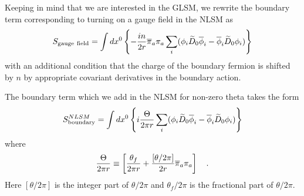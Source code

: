 \documentclass[a4paper,12pt]{article}
\begin{document}
Keeping in mind that we are interested in the GLSM, we rewrite
the boundary term corresponding to turning on a gauge field
in the NLSM as
\begin{equation}
S_{\rm gauge~field}= \int dx^0\left\{ 
-{{in}\over{2 r}} \overline{\pi}_a \pi_a
\sum_i (\phi_i \widetilde{D}_0\overline{\phi}_i - \overline{\phi}_i
\widetilde{D}_0 \phi_i)
\right\}
\end{equation}
with an additional condition that the charge of the boundary fermion
is shifted by $n$ by appropriate covariant derivatives in the boundary
action.

The boundary term which we add in the NLSM for non-zero theta takes the
form
\begin{equation}
S^{NLSM}_{\rm boundary}= \int dx^0\left\{  i{\Theta\over{2\pi r}}
\sum_i (\phi_i \widetilde{D}_0\overline{\phi}_i - \overline{\phi}_i
\widetilde{D}_0 \phi_i)
\right\}
\end{equation}
where 
$$
{\Theta\over{2\pi r}}\equiv \left[{{\theta_f}\over{2\pi r}} 
+{{[\theta/2\pi]}\over{2 r}} \overline{\pi}_a \pi_a\right]\quad.
$$
Here $[\theta/2\pi]$ is the integer part of $\theta/2\pi$ and
$\theta_f/2\pi$ is the fractional part of $\theta/2\pi$.
\end{document}
